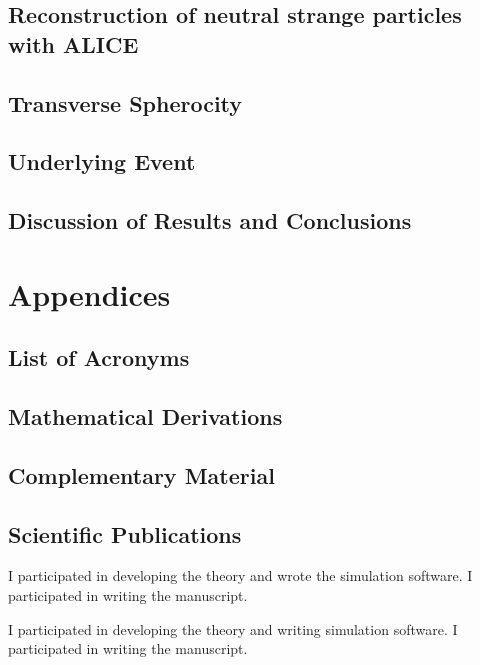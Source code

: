 \documentclass[11pt]{book}
\begin{document}
\chapter{Reconstruction of neutral strange particles with ALICE}

\chapter{Transverse Spherocity}

\chapter{Underlying Event}

\chapter{Discussion of Results and Conclusions}


\appendix
\part{Appendices}
\chapter{List of Acronyms}

\chapter{Mathematical Derivations}

\chapter{Complementary Material}

\chapter{Scientific Publications}



I participated in developing the theory and wrote the simulation software. I participated in writing the manuscript.


I participated in developing the theory and writing simulation software. I participated in writing the manuscript.
\end{document}
